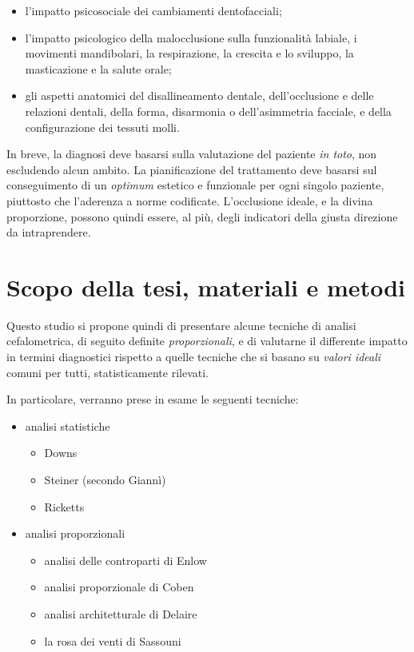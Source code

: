 \begin{itemize}
\item l'impatto psicosociale dei cambiamenti dentofacciali;
\item l'impatto psicologico della malocclusione sulla funzionalità labiale, i movimenti mandibolari, la respirazione, la crescita e lo sviluppo, la masticazione e la salute orale;
\item gli aspetti anatomici del disallineamento dentale, dell'occlusione e delle relazioni dentali, della forma, disarmonia o dell'asimmetria facciale, e della configurazione dei tessuti molli.
\end{itemize}

In breve, la diagnosi deve basarsi sulla valutazione del paziente \textit{in toto}, non escludendo alcun ambito. La pianificazione del trattamento deve basarsi sul conseguimento di un \textit{optimum} estetico e funzionale per ogni singolo paziente, piuttosto che l'aderenza a norme codificate. L'occlusione ideale, e la divina proporzione, possono quindi essere, al più, degli indicatori della giusta direzione da intraprendere.

\section{Scopo della tesi, materiali e metodi}
Questo studio si propone quindi di presentare alcune tecniche di analisi cefalometrica, di seguito definite \textit{proporzionali}, e di valutarne il differente impatto in termini diagnostici rispetto a quelle tecniche che si basano su \textit{valori ideali} comuni per tutti, statisticamente rilevati.

In particolare, verranno prese in esame le seguenti tecniche:
\begin{itemize}
\item analisi statistiche
\begin{itemize}
\item Downs
\item Steiner (secondo Giannì)
\item Ricketts
\end{itemize}
\item analisi proporzionali
\begin{itemize}
\item analisi delle controparti di Enlow
\item analisi proporzionale di Coben
\item analisi architetturale di Delaire
\item la rosa dei venti di Sassouni
\end{itemize}
\end{itemize}


